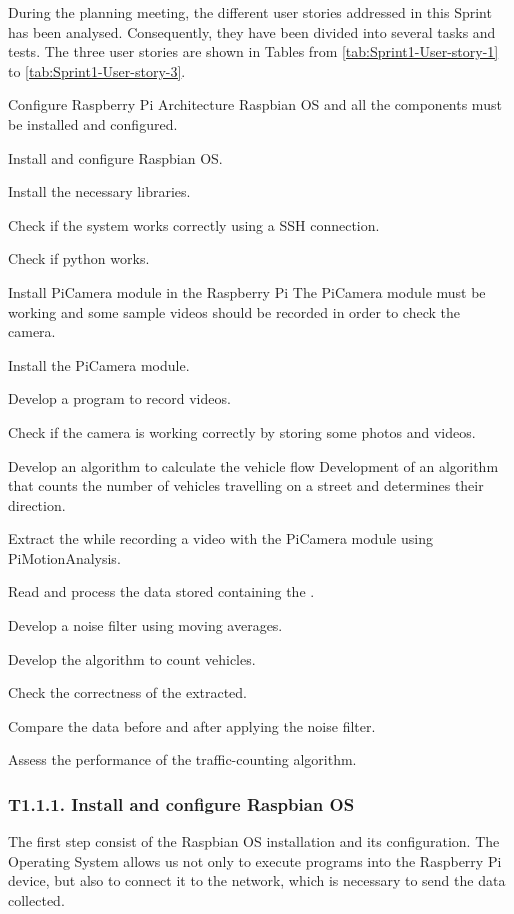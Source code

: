 During the planning meeting, the different user stories addressed in this Sprint has been analysed. Consequently, they have been divided into several tasks and tests. The three user stories are shown in Tables from \ref{tab:Sprint1-User-story-1} to \ref{tab:Sprint1-User-story-3}.

{Configure Raspberry Pi Architecture}
{Raspbian \ac{OS} and all the components must be installed and configured.}
{	\item Install and configure Raspbian \ac{OS}.
	\item Install the necessary libraries.
}{	\item Check if the system works correctly using a SSH connection.
	\item Check if python works.
}

{Install PiCamera module in the Raspberry Pi}
{The PiCamera module must be working and some sample videos should be recorded in order to check the camera.}
{	\item Install the PiCamera module.
	\item Develop a program to record videos.
}{	\item Check if the camera is working correctly by storing some photos and videos.
}

{Develop an algorithm to calculate the vehicle flow}
{Development of an algorithm that counts the number of vehicles travelling on a street and determines their direction.}
{	\item Extract the  while recording a video with the PiCamera module using PiMotionAnalysis.
	\item Read and process the data stored containing the .
	\item Develop a noise filter using moving averages.
	\item Develop the algorithm to count vehicles.
}{	\item Check the correctness of the  extracted.
	\item Compare the data before and after applying the noise filter.
	\item Assess the performance of the traffic-counting algorithm.
}

\subsubsection{T1.1.1. Install and configure Raspbian \ac{OS}}
The first step consist of the Raspbian \ac{OS} installation and its configuration. The Operating System allows us not only to execute programs into the Raspberry Pi device, but also to connect it to the network, which is necessary to send the data collected.

